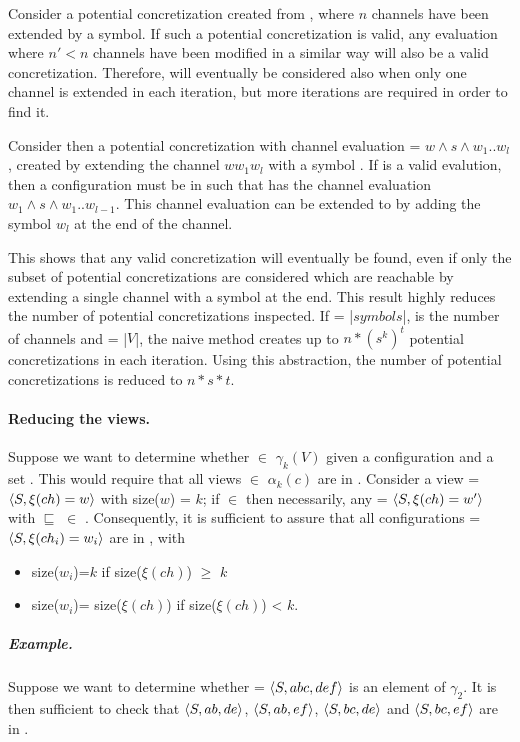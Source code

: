 Consider a potential concretization created from , where $n$ channels have been extended by a symbol.
If such a potential concretization is valid, any evaluation where $n'<n$ channels have been modified in a similar way will also be a valid concretization. Therefore,  will eventually be considered also when only one channel is extended in each iteration, but more iterations are required in order to find it.

Consider then a potential concretization with channel evaluation  = $w \wedge s \wedge w_1..w_l$, created by extending the channel $ww_1w_l$ with a symbol . If  is a valid evalution, then a configuration  must be in  such that  has the channel evaluation $w_1 \wedge s \wedge w_1..w_{l-1}$. This channel evaluation can be extended to  by adding the symbol $w_l$ at the end of the channel.

This shows that any valid concretization will eventually be found, even if only the subset of potential concretizations are considered which are reachable by extending a single channel with a symbol at the end. This result highly reduces the number of potential concretizations inspected. If  = |$symbols$|,  is the number of channels and  = |$V$|, the naive method creates up to $n*(s^k)^t$ potential concretizations in each iteration. Using this abstraction, the number of potential concretizations is reduced to $n*s*t$.

\paragraph{Reducing the views.}
Suppose we want to determine whether  $\in$ $\gamma_k(V)$ given a configuration  and a set . This would require that all views  $\in$ $\alpha_k(c)$ are in . Consider a view  = $\langle S, \xi(ch)=w\rangle$ with size($w$) = $k$; if  $\in$  then necessarily, any  = $\langle S, \xi(ch)=w'\rangle$ with  $\sqsubseteq$  $\in$ . Consequently, it is sufficient to assure that all configurations  = $\langle S,\xi(ch_i)=w_i\rangle$ are in , with

\begin{itemize}
\item
size($w_i$)=$k$ if size($\xi(ch)$) $\geq$ $k$
\item
size($w_i$)= size($\xi(ch)$) if size($\xi(ch)$) < $k$.
\end{itemize}

\subparagraph{Example.} Suppose we want to determine whether  = $\langle S, abc, def\rangle$ is an element of $\gamma_2$. It is then sufficient to check that $\langle S,ab,de\rangle$, $\langle S,ab,ef\rangle$, $\langle S,bc ,de\rangle$ and $\langle S,bc,ef\rangle$ are in .
\\\\\\

